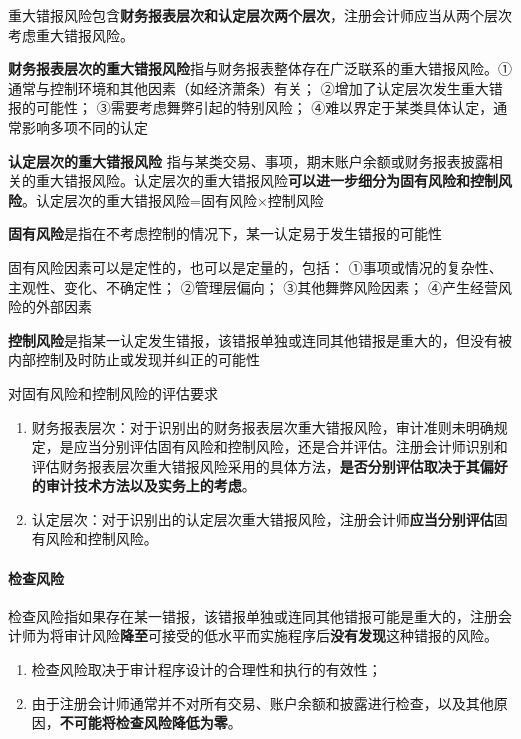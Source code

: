 \documentclass[UTF8,12pt]{ctexart}
\numberwithin{equation}{section} %
\numberwithin{figure}{section}
\numberwithin{table}{section}
\begin{document}
	重大错报风险包含\textbf{财务报表层次和认定层次两个层次}，注册会计师应当从两个层次考虑重大错报风险。
	
	\textbf{财务报表层次的重大错报风险}指与财务报表整体存在广泛联系的重大错报风险。①通常与控制环境和其他因素（如经济萧条）有关；
	②增加了认定层次发生重大错报的可能性；
	③需要考虑舞弊引起的特别风险；
	④难以界定于某类具体认定，通常影响多项不同的认定
	
	\textbf{认定层次的重大错报风险}
	指与某类交易、事项，期末账户余额或财务报表披露相关的重大错报风险。认定层次的重大错报风险\textbf{可以进一步细分为固有风险和控制风险}。认定层次的重大错报风险=固有风险×控制风险
	
	\textbf{固有风险}是指在不考虑控制的情况下，某一认定易于发生错报的可能性
	
	固有风险因素可以是定性的，也可以是定量的，包括：
	①事项或情况的复杂性、主观性、变化、不确定性；
	②管理层偏向；
	③其他舞弊风险因素；
	④产生经营风险的外部因素
	
	\textbf{控制风险}是指某一认定发生错报，该错报单独或连同其他错报是重大的，但没有被内部控制及时防止或发现并纠正的可能性
	
	
	对固有风险和控制风险的评估要求
	\begin{enumerate}
		\item 财务报表层次：对于识别出的财务报表层次重大错报风险，审计准则未明确规定，是应当分别评估固有风险和控制风险，还是合并评估。注册会计师识别和评估财务报表层次重大错报风险采用的具体方法，\textbf{是否分别评估取决于其偏好的审计技术方法以及实务上的考虑}。
		
		\item 认定层次：对于识别出的认定层次重大错报风险，注册会计师\textbf{应当分别评估}固有风险和控制风险。
		
	\end{enumerate}
	
	\paragraph{检查风险}
	检查风险指如果存在某一错报，该错报单独或连同其他错报可能是重大的，注册会计师为将审计风险\textbf{降至}可接受的低水平而实施程序后\textbf{没有发现}这种错报的风险。
	
	\begin{enumerate}
		\item 检查风险取决于审计程序设计的合理性和执行的有效性；
		
		\item 由于注册会计师通常并不对所有交易、账户余额和披露进行检查，以及其他原因，\textbf{不可能将检查风险降低为零}。
	\end{enumerate}
\end{document}
